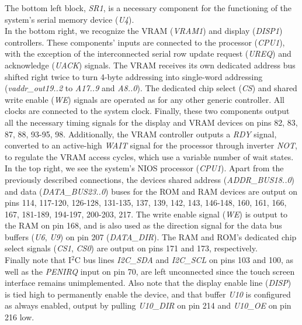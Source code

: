 \documentclass[titlepage]{scrartcl}
\begin{document}
	The bottom left block, \textit{SR1}, is a necessary component for the functioning of the system's serial memory device (\textit{U4}).\\

	In the bottom right, we recognize the VRAM (\textit{VRAM1}) and display (\textit{DISP1}) controllers. These components' inputs are connected to the processor (\textit{CPU1}), with the exception of the interconnected serial row update request (\textit{UREQ}) and acknowledge (\textit{UACK}) signals. The VRAM receives its own dedicated address bus shifted right twice to turn 4-byte addressing into single-word addressing (\textit{vaddr\_out19..2} to \textit{A17..9} and \textit{A8..0}). The dedicated chip select (\textit{CS}) and shared write enable (\textit{WE}) signals are operated as for any other generic controller. All clocks are connected to the system clock. Finally, these two components output all the necessary timing signals for the display and VRAM devices on pins 82, 83, 87, 88, 93-95, 98. Additionally, the VRAM controller outputs a \textit{RDY} signal, converted to an active-high \textit{WAIT} signal for the processor through inverter \textit{NOT}, to regulate the VRAM access cycles, which use a variable number of wait states.\\

	In the top right, we see the system's NIOS processor (\textit{CPU1}). Apart from the previously described connections, the devices shared address (\textit{ADDR\_BUS18..0}) and data (\textit{DATA\_BUS23..0}) buses for the ROM and RAM devices are output on pins 114, 117-120, 126-128, 131-135, 137, 139, 142, 143, 146-148, 160, 161, 166, 167, 181-189, 194-197, 200-203, 217. The write enable signal (\textit{WE}) is output to the RAM on pin 168, and is also used as the direction signal for the data bus buffers (\textit{U6}, \textit{U9}) on pin 207 (\textit{DATA\_DIR}). The RAM and ROM's dedicated chip select signals (\textit{CS1}, \textit{CS0}) are output on pins 171 and 173, respectively.\\

	Finally note that I$^2$C bus lines \textit{I2C\_SDA} and \textit{I2C\_SCL} on pins 103 and 100, as well as the \textit{PENIRQ} input on pin 70, are left unconnected since the touch screen interface remains unimplemented.  Also note that the display enable line (\textit{DISP}) is tied high to permanently enable the device, and that buffer \textit{U10} is configured as always enabled, output by pulling \textit{U10\_DIR} on pin 214 and \textit{U10\_OE} on pin 216 low.\\
\end{document}
